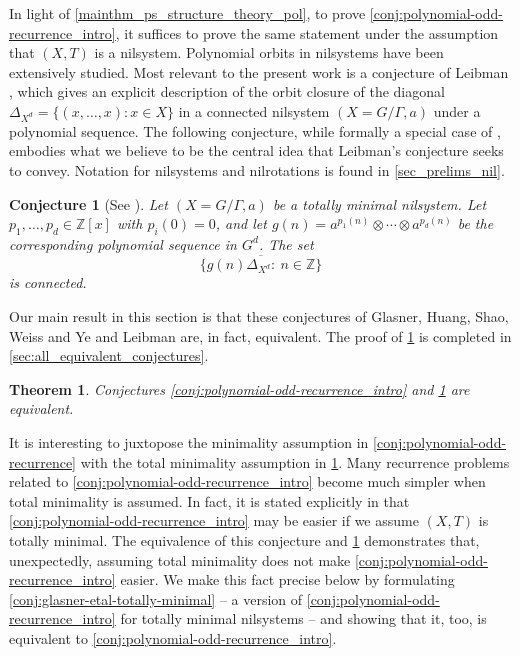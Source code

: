 \documentclass{article}
\theoremstyle{plain}
\newtheorem{Conjecture}[Theorem]{Conjecture}
\theoremstyle{claim}
\theoremstyle{definition}
\theoremstyle{plain}
\newcounter{MainTheoremCounter}
\newtheorem{Maintheorem}[MainTheoremCounter]{Theorem}
\theoremstyle{plain}
\newcommand{\Z}{\mathbb{Z}}
\newcommand{\1}{\boldsymbol{1}}
\begin{document}
In light of \cref{mainthm_ps_structure_theory_pol}, to prove \cref{conj:polynomial-odd-recurrence_intro}, it suffices to prove the same statement under the assumption that $(X,T)$ is a nilsystem.
Polynomial orbits in nilsystems have been extensively studied. Most relevant to the present work is a conjecture of Leibman \cite[Conjecture 11.4]{Leibman10b}, which gives an explicit description of the orbit closure of the diagonal $\Delta_{X^d} = \{(x, \ldots, x) : x \in X\}$ in a connected nilsystem $(X = G/\Gamma, a)$ under a polynomial sequence.
The following conjecture, while formally a special case of \cite[Conjecture 11.4]{Leibman10b}, embodies what we believe to be the central idea that Leibman’s conjecture seeks to convey.
Notation for nilsystems and nilrotations is found in \cref{sec_prelims_nil}.


\begin{Conjecture}[See {\cite[Conjecture 11.4]{Leibman10b}}]
\label{conj:leibmanish_intro}
\label{conj:leibmanish}
Let $(X = G/\Gamma, a)$ be a totally minimal nilsystem. Let $p_1, \ldots, p_d \in \Z[x]$ with $p_i(0) = 0$, and let $g(n) = a^{p_1(n)} \otimes \cdots \otimes a^{p_d(n)}$ be the corresponding polynomial sequence in $G^{d}$. The set
\[
    \overline{\{g(n) \Delta_{X^d}: \ n \in \Z\}}
\]
is connected.
\end{Conjecture}

Our main result in this section is that these conjectures of Glasner, Huang, Shao, Weiss and Ye and Leibman are, in fact, equivalent. The proof of \cref{mainthm_conjecture_are_equiv} is completed in \cref{sec:all_equivalent_conjectures}.

\begin{Maintheorem}
\label{mainthm_conjecture_are_equiv}
Conjectures \ref{conj:polynomial-odd-recurrence_intro} and \ref{conj:leibmanish_intro} are equivalent. 
\end{Maintheorem}

It is interesting to juxtopose the minimality assumption in \cref{conj:polynomial-odd-recurrence} with the total minimality assumption in \cref{conj:leibmanish_intro}. Many recurrence problems related to \cref{conj:polynomial-odd-recurrence_intro} become much simpler when total minimality is assumed. In fact, it is stated explicitly in \cite{glasner_huang_shao_weiss_ye_2020} that \cref{conj:polynomial-odd-recurrence_intro} may be easier if we assume $(X, T)$ is totally minimal. The equivalence of this conjecture and \cref{conj:leibmanish_intro} demonstrates that, unexpectedly, assuming total minimality does not make \cref{conj:polynomial-odd-recurrence_intro} easier.  We make this fact precise below by formulating \cref{conj:glasner-etal-totally-minimal} -- a version of \cref{conj:polynomial-odd-recurrence_intro} for totally minimal nilsystems -- and showing that it, too, is equivalent to \cref{conj:polynomial-odd-recurrence_intro}.
\end{document}
